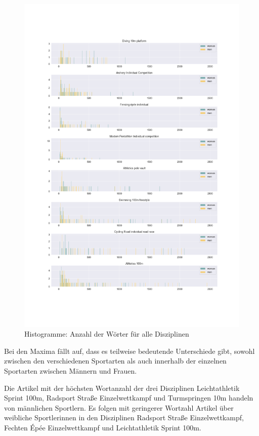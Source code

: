 \documentclass[11pt]{article}
\begin{document}
\begin{figure}
\caption{Histogramme: Anzahl der Wörter für alle Disziplinen}
\includegraphics[width=1\textwidth]{figures/wordcount_disciplines_histogram.png}
\end{figure}

Bei den Maxima fällt auf, dass es teilweise bedeutende Unterschiede gibt, sowohl zwischen den verschiedenen Sportarten als auch innerhalb der einzelnen Sportarten zwischen Männern und Frauen. 

Die Artikel mit der höchsten Wortanzahl der drei Disziplinen Leichtathletik Sprint 100m, Radsport Straße Einzelwettkampf und Turmspringen 10m handeln von männlichen Sportlern. Es folgen mit geringerer Wortzahl Artikel über weibliche Sportlerinnen in den Disziplinen Radsport Straße Einzelwettkampf, Fechten Épée Einzelwettkampf und Leichtathletik Sprint 100m. 
\end{document}
